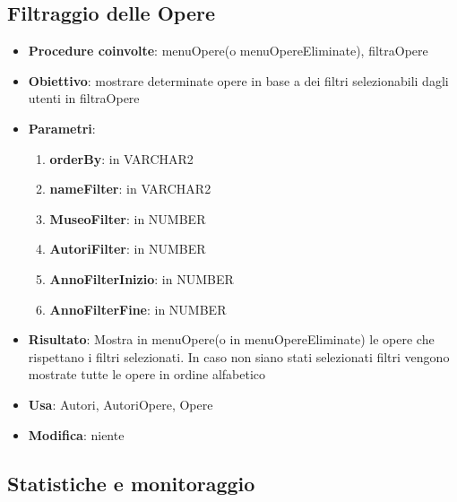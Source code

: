 \label{Filtraggio delle opere}
\subsection{Filtraggio delle Opere}
\begin{itemize}
	\item \textbf{Procedure coinvolte}: menuOpere(o menuOpereEliminate), filtraOpere
	\item \textbf{Obiettivo}: mostrare determinate opere in base a dei filtri selezionabili dagli utenti in filtraOpere
	\item \textbf{Parametri}:
	\begin{enumerate}
		\item \textbf{orderBy}: in VARCHAR2
		\item \textbf{nameFilter}: in VARCHAR2
		\item \textbf{MuseoFilter}: in NUMBER
		\item \textbf{AutoriFilter}: in NUMBER 
		\item \textbf{AnnoFilterInizio}: in NUMBER 
		\item \textbf{AnnoFilterFine}: in NUMBER
	\end{enumerate}
	\item \textbf{Risultato}: Mostra in menuOpere(o in menuOpereEliminate) le opere che rispettano i filtri selezionati. In caso non siano stati selezionati filtri vengono mostrate tutte le opere in ordine alfabetico
	\item \textbf{Usa}: Autori, AutoriOpere, Opere
	\item \textbf{Modifica}: niente
\end{itemize}

\subsection{Statistiche e monitoraggio}

